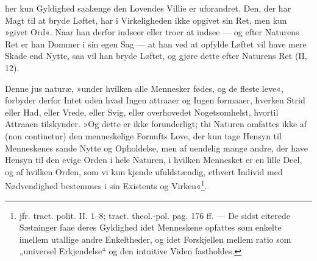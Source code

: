\documentclass[12pt,a4paper]{book}
\newcommand{\opage}[1]{\marginnote{\footnotesize\textit{[#1]}}}
\begin{document}
\opage{135} \setcounter{footnote}{0}%
her kun Gyldighed saalænge den Lovendes Villie er uforandret. Den, der har Magt til at bryde Løftet, har i Virkeligheden ikke opgivet sin Ret, men kun »givet Ord«. Naar han derfor indseer eller troer at indsee --- og efter Naturens Ret er han Dommer i sin egen Sag --- at han ved at opfylde Løftet vil have mere Skade end Nytte, saa vil han bryde Løftet, og gjøre dette efter Naturens Ret (II, 12).

Denne jus naturæ, »under hvilken alle Mennesker fødes, og de fleste leve«, forbyder derfor Intet uden hvad Ingen attraaer og Ingen formaaer, hverken Strid eller Had, eller Vrede, eller Svig, eller overhovedet Nogetsomhelst, hvortil Attraaen tilskynder. »Og dette er ikke forunderligt; thi Naturen omfattes ikke af (non continetur) den menneskelige Fornufts Love, der kun tage Hensyn til Menneskenes sande Nytte og Opholdelse, men af uendelig mange andre, der have Hensyn til den evige Orden i hele Naturen, i hvilken Mennesket er en lille Deel, og af hvilken Orden, som vi kun kjende ufuldstændig, ethvert Individ med Nødvendighed bestemmes i sin Existents og Virken«\footnote{jfr. tract. polit. II. 1--8; tract. theol.-pol. pag. 176 ff. --- De sidst citerede Sætninger faae deres Gyldighed idet Menneskene opfattes som enkelte imellem utallige andre Enkeltheder, og idet Forskjellen mellem ratio som „universel Erkjendelse“ og den intuitive Viden fastholdes.}.
\end{document}
